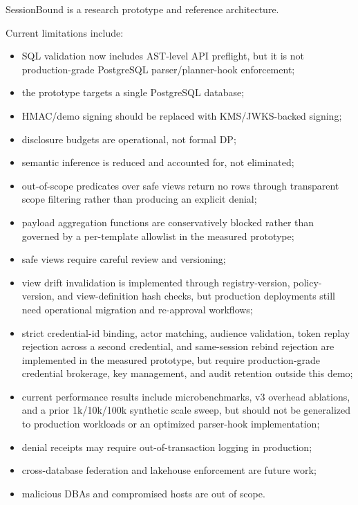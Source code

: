 \documentclass[journal]{IEEEtran}
\providecommand{\tightlist}{%
  \setlength{\itemsep}{0pt}\setlength{\parskip}{0pt}}
\begin{document}
SessionBound is a research prototype and reference architecture.

Current limitations include:

\begin{itemize}
\tightlist
\item
  SQL validation now includes AST-level API preflight, but it is not
  production-grade PostgreSQL parser/planner-hook enforcement;
\item
  the prototype targets a single PostgreSQL database;
\item
  HMAC/demo signing should be replaced with KMS/JWKS-backed signing;
\item
  disclosure budgets are operational, not formal DP;
\item
  semantic inference is reduced and accounted for, not eliminated;
\item
  out-of-scope predicates over safe views return no rows through
  transparent scope filtering rather than producing an explicit denial;
\item
  payload aggregation functions are conservatively blocked rather than
  governed by a per-template allowlist in the measured prototype;
\item
  safe views require careful review and versioning;
\item
  view drift invalidation is implemented through registry-version,
  policy-version, and view-definition hash checks, but production
  deployments still need operational migration and re-approval workflows;
\item
  strict credential-id binding, actor matching, audience validation,
  token replay rejection across a second credential, and same-session
  rebind rejection are implemented in the measured prototype, but require
  production-grade credential brokerage, key management, and audit
  retention outside this demo;
\item
  current performance results include microbenchmarks, v3 overhead
  ablations, and a prior 1k/10k/100k synthetic scale sweep, but should
  not be generalized to production workloads or an optimized parser-hook
  implementation;
\item
  denial receipts may require out-of-transaction logging in production;
\item
  cross-database federation and lakehouse enforcement are future work;
\item
  malicious DBAs and compromised hosts are out of scope.
\end{itemize}
\end{document}
